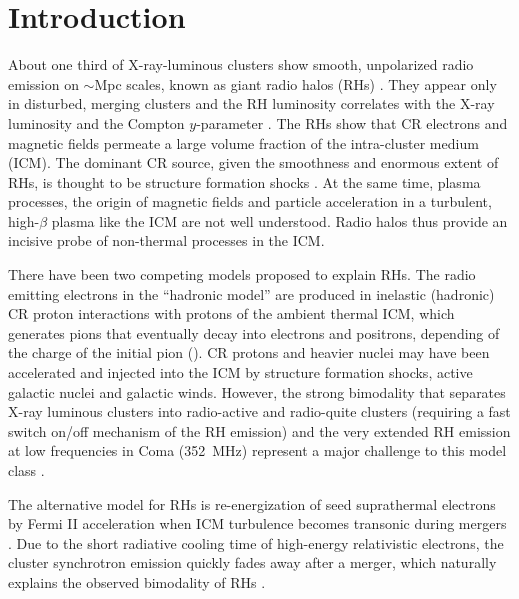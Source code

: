 \documentclass[fleqn,usenatbib,useAMS]{mnras}
\begin{document}
\section{Introduction}
About one third of X-ray-luminous clusters show smooth, unpolarized
radio emission on $\sim$Mpc scales, known as giant radio halos (RHs)
\citep{2014IJMPD..2330007B}. They appear only in disturbed, merging
clusters and the RH luminosity correlates with the X-ray luminosity
\citep{2001A&A...369..441G,2012A&ARv..20...54F} and the Compton
$y$-parameter \citep{2012MNRAS.421L.112B,2013A&A...554A.140P}. The RHs
show that CR electrons and magnetic fields permeate a large volume
fraction of the intra-cluster medium (ICM). The dominant CR source,
given the smoothness and enormous extent of RHs, is thought to be
structure formation shocks \citep{miniati01,pfrommer08}. At the same
time, plasma processes, the origin of magnetic fields and particle
acceleration in a turbulent, high-$\beta$ plasma like the ICM are not
well understood. Radio halos thus provide an incisive probe of
non-thermal processes in the ICM.

There have been two competing models proposed to explain RHs.  The
radio emitting electrons in the ``hadronic model'' are produced in
inelastic (hadronic) CR proton interactions with protons of the
ambient thermal ICM, which generates pions that eventually decay into
electrons and positrons, depending of the charge of the initial pion
(\citealp{1980ApJ...239L..93D,1999APh....12..169B,2001ApJ...562..233M,
  2004A&A...413...17P,2008MNRAS.385.1211P,ensslin11}). CR protons and
heavier nuclei may have been accelerated and injected into the ICM by
structure formation shocks, active galactic nuclei and galactic
winds. However, the strong bimodality that separates X-ray luminous
clusters into radio-active and radio-quite clusters (requiring a
fast switch on/off mechanism of the RH emission) and the very extended
RH emission at low frequencies in Coma (352~MHz) represent a major
challenge to this model class \citep{brunetti12,2014MNRAS.438..124Z}.

The alternative model for RHs is re-energization of seed suprathermal
electrons by Fermi II acceleration when ICM turbulence becomes
transonic during mergers
\citep{1987A&A...182...21S,1993ApJ...406..399G,2001MNRAS.320..365B,
  2004MNRAS.350.1174B,brunetti07,brunetti11,2015ApJ...800...60M}. Due
to the short radiative cooling time of high-energy relativistic
electrons, the cluster synchrotron emission quickly fades away after a
merger, which naturally explains the observed bimodality of RHs
\cite[see e.g.][]{2013MNRAS.429.3564D,2014MNRAS.443.3564D}.
\end{document}
